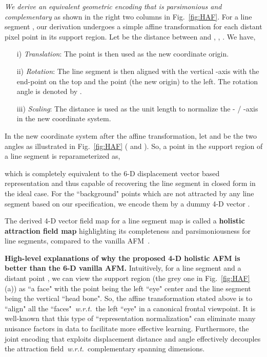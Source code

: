 \documentclass[10pt,twocolumn,letterpaper]{article}
\newcommand{\compresslist}{\setlength{\itemsep}{0pt}\setlength{\parskip}{0pt}\setlength{\parsep}{0pt}}
\begin{document}
\textit{We derive an equivalent geometric encoding that is parsimonious  and complementary } as shown in the right two columns in Fig.~\ref{fig:HAF}. For a line segment , our derivation undergoes a simple affine transformation for each distant pixel point  in its support region. Let  be the distance between  and , \ie, . We have,  
\begin{enumerate}\compresslist
    \item [i)] \textit{Translation}: The point  is then used as the new coordinate origin. 
    \item [ii)] \textit{Rotation}: The line segment is then aligned with the vertical -axis with the end-point  on the top and the point  (the new origin) to the left. The rotation angle is denoted by .
    \item [iii)] \textit{Scaling}: The distance  is used as the unit length to normalize the - / -axis in the new coordinate system.  
\end{enumerate}

In the new coordinate system after the affine transformation, let  and  be the two angles as illustrated in Fig.~\ref{fig:HAF} ( and ). So, a point  in the support region of a line segment  is reparameterized as, 

which is completely equivalent to the 6-D displacement vector based representation and thus capable of recovering the line segment in closed form in the ideal case. 
For the ``background" points which are not attracted by any line segment based on our specification, we encode them by a dummy 4-D vector . 

The derived 4-D vector field map for a line segment map is called a \textbf{holistic attraction field map} highlighting its completeness and parsimoniousness for line segments, compared to the vanilla AFM~\cite{afm}. 

\textbf{High-level explanations of why the proposed 4-D holistic AFM is better than the 6-D vanilla AFM.} Intuitively, for a line segment and a distant point , we can view the support region (the grey one in Fig.~\ref{fig:HAF} (a)) as ``a face" with the point  being the left ``eye" center and the line segment being the vertical ``head bone". So, the affine transformation stated above is to ``align" all the ``faces"~\emph{w.r.t.}~the left ``eye" in a canonical frontal viewpoint. It is well-known that this type of  ``representation normalization" can eliminate many nuisance factors in data to facilitate more effective learning. Furthermore, the joint encoding that exploits displacement distance and angle effectively decouples the attraction field~\emph{w.r.t.}~complementary spanning dimensions.      
\end{document}
